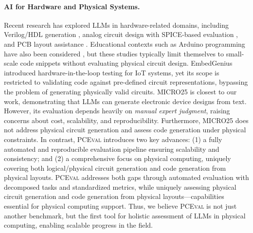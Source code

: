 \documentclass{article} %
\begin{document}
\paragraph{AI for Hardware and Physical Systems.}  
Recent research has explored LLMs in hardware-related domains, including Verilog/HDL generation \citep{liu2023verilogeval,thakur2024verigen}, analog circuit design with SPICE-based evaluation \citep{lai2025analogcoder}, and PCB layout assistance \citep{liu2025layoutcopilot}.  
Educational contexts such as Arduino programming have also been considered \citep{johnson2024using,Subramanium2024ApplicationOA}, but these studies typically limit themselves to small-scale code snippets without evaluating physical circuit design.
EmbedGenius \citep{yang2024embedgenius} introduced hardware-in-the-loop testing for IoT systems, yet its scope is restricted to validating code against pre-defined circuit representations, bypassing the problem of generating physically valid circuits.
MICRO25 \citep{jansen2023words} is closest to our work, demonstrating that LLMs can generate electronic device designs from text.
However, its evaluation depends heavily on \emph{manual expert judgment}, raising concerns about cost, scalability, and reproducibility.
Furthermore, MICRO25 does not address physical circuit generation and assess code generation under physical constraints.
In contrast, \textsc{PCEval} introduces two key advances:  
(1) a fully automated and reproducible evaluation pipeline ensuring scalability and consistency; and  
(2) a comprehensive focus on physical computing, uniquely covering both logical/physical circuit generation and code generation from physical layouts.  
\textsc{PCEval} addresses both gaps through automated evaluation with decomposed tasks and standardized metrics, while uniquely assessing physical circuit generation and code generation from physical layouts—capabilities essential for physical computing support.
Thus, we believe \textsc{PCEval} is not just another benchmark, but the first tool for holistic assessment of LLMs in physical computing, enabling scalable progress in the field.
\end{document}
